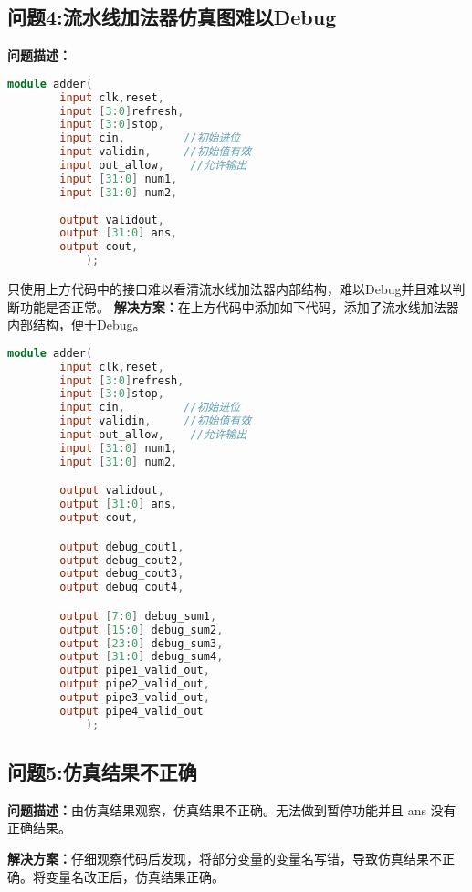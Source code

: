 \subsection{问题4:流水线加法器仿真图难以Debug}
\textbf{问题描述：}
\begin{lstlisting}[language=Verilog]
    module adder(
        input clk,reset,
        input [3:0]refresh,
        input [3:0]stop,
        input cin,         //初始进位
        input validin,     //初始值有效
        input out_allow,    //允许输出
        input [31:0] num1,
        input [31:0] num2,
        
        output validout,
        output [31:0] ans,
        output cout,
            );
\end{lstlisting}
只使用上方代码中的接口难以看清流水线加法器内部结构，难以Debug并且难以判断功能是否正常。
\textbf{解决方案：}在上方代码中添加如下代码，添加了流水线加法器内部结构，便于Debug。
\begin{lstlisting}[language=Verilog]
    module adder(
        input clk,reset,
        input [3:0]refresh,
        input [3:0]stop,
        input cin,         //初始进位
        input validin,     //初始值有效
        input out_allow,    //允许输出
        input [31:0] num1,
        input [31:0] num2,

        output validout,
        output [31:0] ans,
        output cout,

        output debug_cout1,
        output debug_cout2,
        output debug_cout3,
        output debug_cout4,

        output [7:0] debug_sum1,
        output [15:0] debug_sum2,
        output [23:0] debug_sum3,
        output [31:0] debug_sum4,
        output pipe1_valid_out,
        output pipe2_valid_out,
        output pipe3_valid_out,
        output pipe4_valid_out
            );
\end{lstlisting}

\subsection{问题5:仿真结果不正确}
\textbf{问题描述：}由仿真结果观察，仿真结果不正确。无法做到暂停功能并且 ans 没有正确结果。

\textbf{解决方案：}仔细观察代码后发现，将部分变量的变量名写错，导致仿真结果不正确。将变量名改正后，仿真结果正确。
